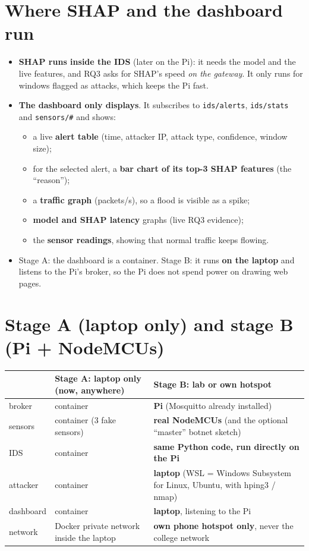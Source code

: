 \documentclass[11pt]{article}
\begin{document}
\section{Where SHAP and the dashboard run}
\begin{itemize}
\item \textbf{SHAP runs inside the IDS} (later on the Pi): it needs the model and the live features, and RQ3 asks for SHAP's speed \emph{on the gateway}.
It only runs for windows flagged as attacks, which keeps the Pi fast.
\item \textbf{The dashboard only displays}. It subscribes to \texttt{ids/alerts}, \texttt{ids/stats} and \texttt{sensors/\#} and shows:
\begin{itemize}
\item a live \textbf{alert table} (time, attacker IP, attack type, confidence, window size);
\item for the selected alert, a \textbf{bar chart of its top-3 SHAP features} (the ``reason'');
\item a \textbf{traffic graph} (packets/s), so a flood is visible as a spike;
\item \textbf{model and SHAP latency} graphs (live RQ3 evidence);
\item the \textbf{sensor readings}, showing that normal traffic keeps flowing.
\end{itemize}
\item Stage A: the dashboard is a container. Stage B: it runs \textbf{on the laptop} and listens to the Pi's broker, so the Pi does not spend power on drawing web pages.
\end{itemize}

\section{Stage A (laptop only) and stage B (Pi + NodeMCUs)}
\begin{longtable}{@{}l >{\raggedright}p{6.4cm} >{\raggedright\arraybackslash}p{6.4cm}@{}}
\toprule
& \textbf{Stage A: laptop only (now, anywhere)} & \textbf{Stage B: lab or own hotspot} \\
\midrule
\endhead
broker & container & \textbf{Pi} (Mosquitto already installed) \\
sensors & container (3 fake sensors) & \textbf{real NodeMCUs} (and the optional ``master'' botnet sketch) \\
IDS & container & \textbf{same Python code, run directly on the Pi} \\
attacker & container & \textbf{laptop} (WSL = Windows Subsystem for Linux, Ubuntu, with hping3 / nmap) \\
dashboard & container & \textbf{laptop}, listening to the Pi \\
network & Docker private network inside the laptop & \textbf{own phone hotspot only}, never the college network \\
\bottomrule
\end{longtable}
\end{document}
